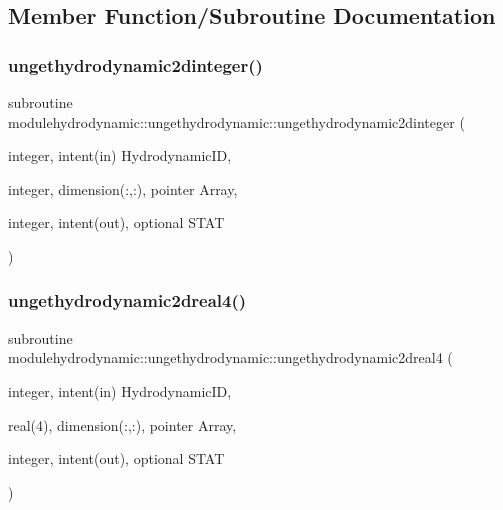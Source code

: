 \subsection{Member Function/\+Subroutine Documentation}
\mbox{\label{interfacemodulehydrodynamic_1_1ungethydrodynamic_a15424adfde86a1a3ea98971ac700c039}} 
\subsubsection{\texorpdfstring{ungethydrodynamic2dinteger()}{ungethydrodynamic2dinteger()}}
{\footnotesize\ttfamily subroutine modulehydrodynamic\+::ungethydrodynamic\+::ungethydrodynamic2dinteger (\begin{DoxyParamCaption}\item[{integer, intent(in)}]{Hydrodynamic\+ID,  }\item[{integer, dimension(\+:,\+:), pointer}]{Array,  }\item[{integer, intent(out), optional}]{S\+T\+AT }\end{DoxyParamCaption})\hspace{0.3cm}{\ttfamily [private]}}

\mbox{\label{interfacemodulehydrodynamic_1_1ungethydrodynamic_a34666c5d52c52555332ea3ca8f5beda3}} 
\subsubsection{\texorpdfstring{ungethydrodynamic2dreal4()}{ungethydrodynamic2dreal4()}}
{\footnotesize\ttfamily subroutine modulehydrodynamic\+::ungethydrodynamic\+::ungethydrodynamic2dreal4 (\begin{DoxyParamCaption}\item[{integer, intent(in)}]{Hydrodynamic\+ID,  }\item[{real(4), dimension(\+:,\+:), pointer}]{Array,  }\item[{integer, intent(out), optional}]{S\+T\+AT }\end{DoxyParamCaption})\hspace{0.3cm}{\ttfamily [private]}}

